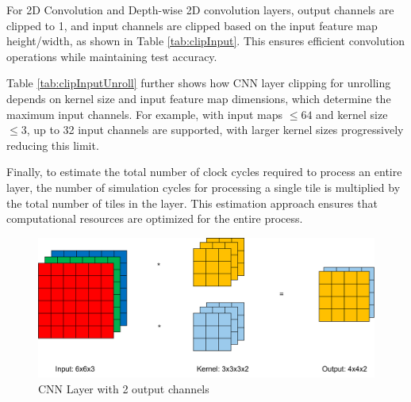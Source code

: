 For 2D Convolution and Depth-wise 2D convolution layers, output channels are clipped to 1, and input channels are clipped based on the input feature map height/width, as shown in Table \ref{tab:clipInput}. This ensures efficient convolution operations while maintaining test accuracy.
\\
\begin{table}[H]
\caption{CNN layers clipping for unrolling based on input feature map and kernel size}
\label{tab:clipInputUnroll}
\centering
{}
\end{table}

Table \ref{tab:clipInputUnroll} further shows how CNN layer clipping for unrolling depends on kernel size and input feature map dimensions, which determine the maximum input channels. For example, with input maps $\leq 64$ and kernel size $\leq 3$, up to 32 input channels are supported, with larger kernel sizes progressively reducing this limit.

Finally, to estimate the total number of clock cycles required to process an entire layer, the number of simulation cycles for processing a single tile is multiplied by the total number of tiles in the layer. This estimation approach ensures that computational resources are optimized for the entire process.


\begin{figure}[H]
    \centering
    \includegraphics[width=0.7\linewidth]{figure//chapter3_implementation/Figure 6 - output channels 2.png}
    \caption{CNN Layer with 2 output channels}
    \label{fig:2OpCh}
\end{figure}

